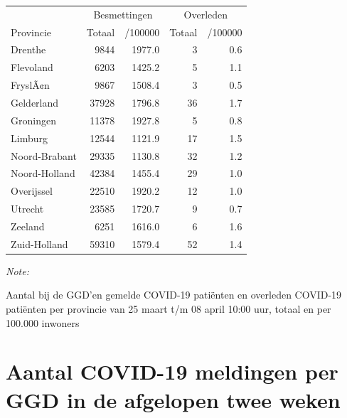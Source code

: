 \documentclass[
  english,
  man,floatsintext]{apa6}
\begin{document}
\begin{table}
\centering
\begin{threeparttable}
\begin{tabular}{lrrrr}
\toprule
\multicolumn{1}{c}{ } & \multicolumn{2}{c}{Besmettingen} & \multicolumn{2}{c}{Overleden} \\
\cmidrule(l{3pt}r{3pt}){2-3} \cmidrule(l{3pt}r{3pt}){4-5}
Provincie & Totaal & /100000 & Totaal & /100000\\
\midrule
Drenthe & 9844 & 1977.0 & 3 & 0.6\\
Flevoland & 6203 & 1425.2 & 5 & 1.1\\
FryslÃ¢n & 9867 & 1508.4 & 3 & 0.5\\
Gelderland & 37928 & 1796.8 & 36 & 1.7\\
Groningen & 11378 & 1927.8 & 5 & 0.8\\
Limburg & 12544 & 1121.9 & 17 & 1.5\\
Noord-Brabant & 29335 & 1130.8 & 32 & 1.2\\
Noord-Holland & 42384 & 1455.4 & 29 & 1.0\\
Overijssel & 22510 & 1920.2 & 12 & 1.0\\
Utrecht & 23585 & 1720.7 & 9 & 0.7\\
Zeeland & 6251 & 1616.0 & 6 & 1.6\\
Zuid-Holland & 59310 & 1579.4 & 52 & 1.4\\
\bottomrule
\end{tabular}
\begin{tablenotes}
\item \textit{Note: } 
\item Aantal bij de GGD’en gemelde COVID-19 patiënten en overleden COVID-19 patiënten per provincie van 25 maart t/m 08 april 10:00 uur, totaal en per 100.000 inwoners
\end{tablenotes}
\end{threeparttable}
\end{table}

\newpage

\hypertarget{aantal-covid-19-meldingen-per-ggd-in-de-afgelopen-twee-weken}{%
\section{Aantal COVID-19 meldingen per GGD in de afgelopen twee weken}\label{aantal-covid-19-meldingen-per-ggd-in-de-afgelopen-twee-weken}}
\end{document}
